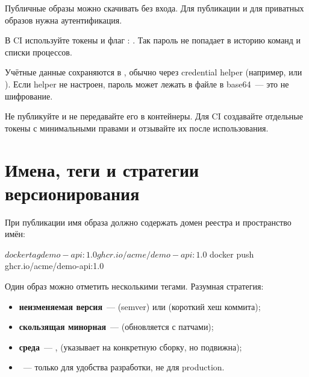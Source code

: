 Публичные образы можно скачивать без входа. Для публикации и для
приватных образов нужна аутентификация.


\begin{tipbox}
В CI используйте токены и флаг :
.
Так пароль не попадает в историю команд и списки процессов.
\end{tipbox}

Учётные данные сохраняются в ,
обычно через credential helper (например,  или
). Если helper не настроен, пароль может лежать
в файле в base64~--- это не шифрование.

\begin{warnbox}
Не публикуйте  и не передавайте
его в контейнеры. Для CI создавайте отдельные токены с минимальными
правами и отзывайте их после использования.
\end{warnbox}

\section{Имена, теги и стратегии версионирования}

При публикации имя образа должно содержать домен реестра и пространство
имён:

\begin{code}[language=bash]
$ docker tag demo-api:1.0 ghcr.io/acme/demo-api:1.0
$ docker push ghcr.io/acme/demo-api:1.0
\end{code}

Один образ можно отметить несколькими тегами. Разумная стратегия:

\begin{itemize}
  \item \textbf{неизменяемая версия}~---  (semver) или
         (короткий хеш коммита);
  \item \textbf{скользящая минорная}~---  (обновляется
        с патчами);
  \item \textbf{среда}~--- ,  (указывает
        на конкретную сборку, но подвижна);
  \item {}~--- только для удобства разработки, не для
        production.
\end{itemize}

